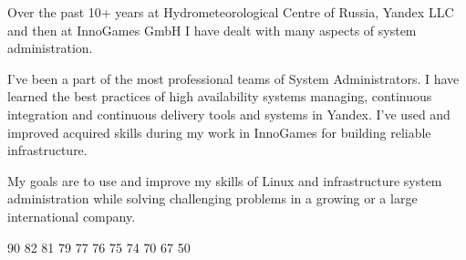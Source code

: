 \documentclass[11pt]{developercv} %
\begin{document}
\vspace{1.5cm}



\begin{minipage}[t]{0.48\textwidth} %
  \parindent=2mm
  Over the past 10+ years at Hydrometeorological Centre of Russia, Yandex LLC and then at InnoGames GmbH I have dealt with many aspects of system administration.

  I've been a part of the most professional teams of System Administrators. I have learned the best practices of high availability systems managing, continuous integration and continuous delivery tools and systems in Yandex. I've used and improved acquired skills during my work in InnoGames for building reliable infrastructure.

  My goals are to use and improve my skills of Linux and infrastructure system administration while solving challenging problems in a growing or a large international company.
\end{minipage}
\hfill %
\begin{minipage}[t]{0.5\textwidth} %
  \vspace{-\baselineskip} %
  \small
  \begin{barchart}{5}
                  {90}
         {82}
                  {81}
     {79}
          {77}
                  {76}
                  {75}
                    {74}
                   {70}
                 {67}
               {50}
  \end{barchart}
\end{minipage}

\begin{center}
\end{center}

\vspace{1.5cm}
\end{document}
